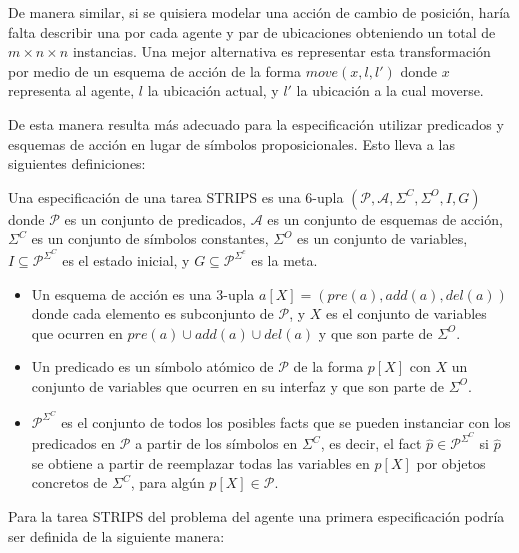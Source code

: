 De manera similar, si se quisiera modelar una acción de cambio de posición,
haría falta describir una por cada agente y par de ubicaciones obteniendo un
total de $m \times n \times n$ instancias. Una mejor alternativa es representar
esta transformación por medio de un esquema de acción de la forma $move(x, l,
l')$ donde $x$ representa al agente, $l$ la ubicación actual, y $l'$ la
ubicación a la cual moverse.

De esta manera resulta más adecuado para la especificación utilizar predicados y
esquemas de acción en lugar de símbolos proposicionales. Esto lleva a las
siguientes definiciones:

\begin{mydef}
    Una especificación de una tarea STRIPS es una 6-upla $(\mathcal{P},
    \mathcal{A}, \Sigma^{C}, \Sigma^{O}, I, G)$  donde $\mathcal{P}$ es un
    conjunto de predicados, $\mathcal{A}$ es un conjunto de esquemas de acción,
    $\Sigma^{C}$ es un conjunto de símbolos constantes, $\Sigma^{O}$ es un
    conjunto de variables, $I \subseteq \mathcal{P}^{\Sigma^{C}}$ es el estado inicial, y
    $G \subseteq \mathcal{P}^{\Sigma^{c}}$ es la meta.

    \begin{itemize}
        \item Un esquema de acción es una 3-upla $a[X] = (pre(a), add(a),
        del(a))$ donde cada elemento es subconjunto de $\mathcal{P}$, y $X$ es
        el conjunto de variables que ocurren en $pre(a) \cup add(a) \cup del(a)$
        y que son parte de $\Sigma^{O}$.
        \item Un predicado es un símbolo atómico de $\mathcal{P}$ de la forma
        $p[X]$ con $X$ un conjunto de variables que ocurren en su interfaz y que
        son parte de $\Sigma^{O}$.
        \item $\mathcal{P}^{\Sigma^{C}}$ es el conjunto de todos los posibles
        facts que se pueden instanciar con los predicados en $\mathcal{P}$ a
        partir de los símbolos en $\Sigma^C$, es decir, el fact $\hat{p} \in
        \mathcal{P}^{\Sigma^{C}}$ si $\hat{p}$ se obtiene a partir de reemplazar
        todas las variables en $p[X]$ por objetos concretos de $\Sigma^{C}$,
        para algún $p[X] \in \mathcal{P}$.
    \end{itemize}
\end{mydef}

Para la tarea STRIPS del problema del agente una primera especificación podría
ser definida de la siguiente manera:

